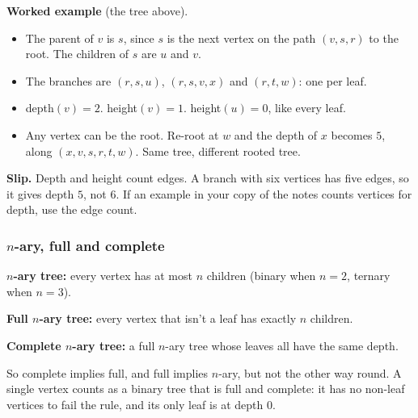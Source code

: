 \textbf{Worked example} (the tree above).
\begin{itemize}
\item The parent of $v$ is $s$, since $s$ is the next vertex on the path $(v,s,r)$ to the root. The children of $s$ are $u$ and $v$.
\item The branches are $(r,s,u)$, $(r,s,v,x)$ and $(r,t,w)$: one per leaf.
\item depth$(v)=2$. height$(v)=1$. height$(u)=0$, like every leaf.
\item Any vertex can be the root. Re-root at $w$ and the depth of $x$ becomes $5$, along $(x,v,s,r,t,w)$. Same tree, different rooted tree.
\end{itemize}

\textbf{Slip.} Depth and height count edges. A branch with six vertices has five edges, so it gives depth $5$, not $6$. If an example in your copy of the notes counts vertices for depth, use the edge count.

\subsubsection{$n$-ary, full and complete}

\begin{notebox}
\textbf{$n$-ary tree:} every vertex has at most $n$ children (binary when $n=2$, ternary when $n=3$).

\textbf{Full $n$-ary tree:} every vertex that isn't a leaf has exactly $n$ children.

\textbf{Complete $n$-ary tree:} a full $n$-ary tree whose leaves all have the same depth.
\end{notebox}

So complete implies full, and full implies $n$-ary, but not the other way round. A single vertex counts as a binary tree that is full and complete: it has no non-leaf vertices to fail the rule, and its only leaf is at depth $0$.

